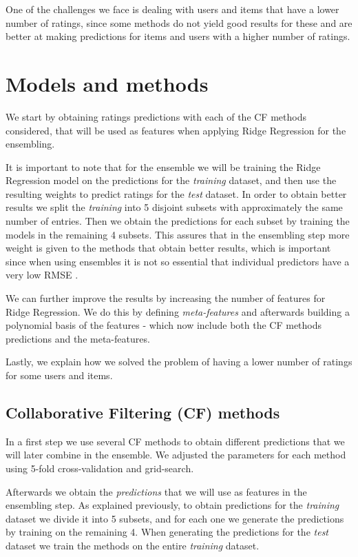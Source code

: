 \documentclass[10pt,conference,compsocconf]{IEEEtran}
\begin{document}
  One of the challenges we face is dealing with users and items that have a lower number of ratings, since some methods do not yield good results for these and are better at making predictions for items and users with a higher number of ratings.

\section{Models and methods}
	\label{sec:models-methods}
  We start by obtaining ratings predictions with each of the CF methods considered, that will be used as features when applying Ridge Regression for the ensembling.

  It is important to note that for the ensemble we will be training the Ridge Regression model on the predictions for the \emph{training} dataset, and then use the resulting weights to predict ratings for the \emph{test} dataset. In order to obtain better results we split the \emph{training} into 5 disjoint subsets with approximately the same number of entries. Then we obtain the predictions for each subset by training the models in the remaining 4 subsets. This assures that in the ensembling step more weight is given to the methods that obtain better results, which is important since when using ensembles it is not so essential that individual predictors have a very low RMSE \cite{toscher2009bigchaos}.

  We can further improve the results by increasing the number of features for Ridge Regression. We do this by defining \emph{meta-features} and afterwards building a polynomial basis of the features - which now include both the CF methods predictions and the meta-features.

  Lastly, we explain how we solved the problem of having a lower number of ratings for some users and items.

  \subsection{Collaborative Filtering (CF) methods} %
  \label{sub:collaborative_filtering_methods}
    In a first step we use several CF methods to obtain different predictions that we will later combine in the ensemble. We adjusted the parameters for each method using 5-fold cross-validation and grid-search.

    Afterwards we obtain the \emph{predictions} that we will use as features in the ensembling step. As explained previously, to obtain predictions for the \emph{training} dataset we divide it into 5 subsets, and for each one we generate the predictions by training on the remaining 4. When generating the predictions for the \emph{test} dataset we train the methods on the entire \emph{training} dataset.
\end{document}

